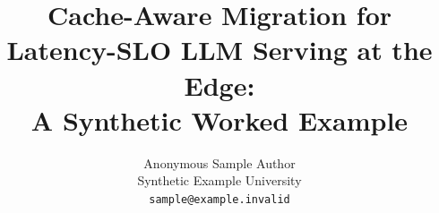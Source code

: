\documentclass[11pt,a4paper]{article}
\title{Cache-Aware Migration for Latency-SLO LLM Serving at the Edge:\\
       A Synthetic Worked Example}
\author{Anonymous Sample Author\\
        \small Synthetic Example University\\
        \small \texttt{sample@example.invalid}}
\date{}
\begin{document}
\maketitle

\begin{abstract}

\end{abstract}








\end{document}
